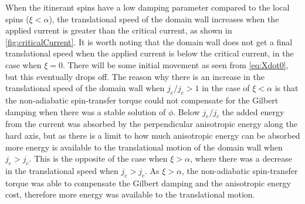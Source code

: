 \documentclass[1p]{elsarticle}		%
\numberwithin{equation}{section}
\begin{document}
When the itinerant spins have a low damping parameter compared to the local spins ($\xi<\alpha$), the translational speed of the domain wall increases when the applied current is greater than the critical current, as shown in \ref{fig:criticalCurrent}. It is worth noting that the domain wall does not get a final translational speed when the applied current is below the critical current, in the case when $\xi=0$. There will be some initial movement as seen from \eqref{eq:Xdot0}, but this eventually drops off. The reason why there is an increase in the translational speed of the domain wall when $j_e/j_c>1$ in the case of $\xi<\alpha$ is that the non-adiabatic spin-transfer torque could not compensate for the Gilbert damping when there was a stable solution of $\phi$. Below $j_e/j_c$ the added energy from the current was absorbed by the perpendicular anisotropic energy along the hard axis, but as there is a limit to how much anisotropic energy can be absorbed more energy is available to the translational motion of the domain wall when $j_e>j_c$. This is the opposite of the case when $\xi>\alpha$, where there was a decrease in the translational speed when $j_e>j_c$. As $\xi>\alpha$, the non-adiabatic spin-transfer torque was able to compensate the Gilbert damping and the anisotropic energy cost, therefore more energy was available to the translational motion.\\
\end{document}
